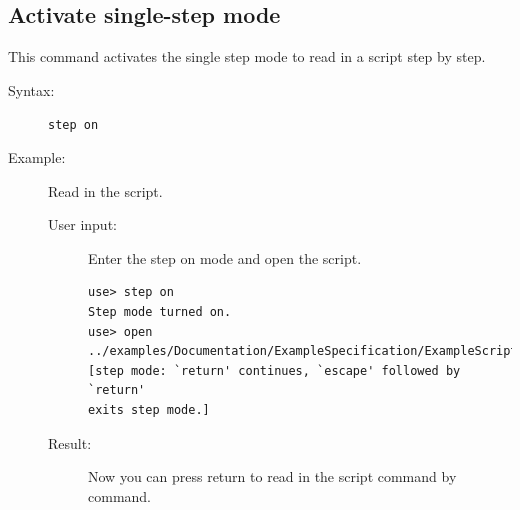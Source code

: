 \documentclass[a4paper,titlepage,oneside,final]{scrreprt} %
\begin{document}
\subsection{Activate single-step mode}
This command activates the single step mode to read in a script
step by step.
\begin{description}
\item[Syntax:] \verb+step on+
\item[Example:] Read in the script.
\begin{description}
\item[User input:] Enter the step on mode and open the script.
\begin{verbatim}
use> step on
Step mode turned on.
use> open ../examples/Documentation/ExampleSpecification/ExampleScript.cmd
[step mode: `return' continues, `escape' followed by `return'
exits step mode.]
\end{verbatim}
\item[Result:] Now you can press return to read in the script command by command.
\end{description}
\end{description}
\end{document}
